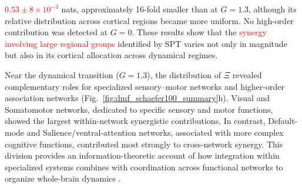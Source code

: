 \documentclass[fleqn,10pt]{wlscirep}
\newcommand{\rev}[1]{\textcolor{red}{#1}}
\theoremstyle{naturetheorem}
\begin{document}
\rev{$0.53\pm8\times10^{-3}$} nats, approximately 16-fold smaller than at $G=1.3$, although its relative distribution across cortical regions became more uniform. No high-order contribution was detected at $G=0$. These results show that the %
\rev{synergy involving large regional groups} identified by SPT varies not only in magnitude but also in its cortical allocation across dynamical regimes.


Near the dynamical transition ($G=1.3$), the distribution of $\Xi$ revealed complementary roles for specialized sensory–motor networks and higher-order association networks (Fig.~\ref{fig:dmf_schaefer100_summary}h). Visual and Somatomotor networks, dedicated to specific sensory and motor functions, showed the largest within-network synergistic contributions. In contrast, Default-mode and Salience/ventral-attention networks, associated with more complex cognitive functions, contributed most strongly to cross-network synergy. This division provides an information-theoretic account of how integration within specialized systems combines with coordination across functional networks to organize whole-brain dynamics \cite{luppi2022synergistic,Wang2021SegregationIntegrationBalance}.
\end{document}
